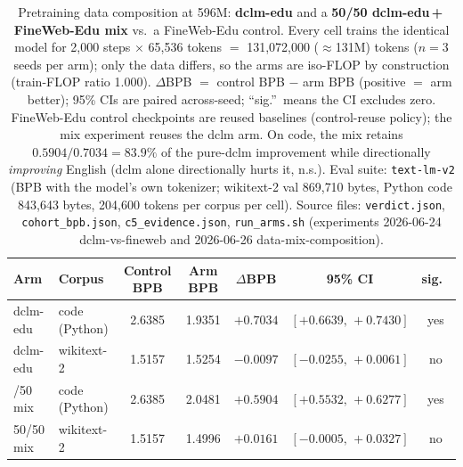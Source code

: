 \begin{table}[t]
\centering
\caption{Pretraining data composition at 596M: \textbf{dclm-edu} and a \textbf{50/50 dclm-edu\,+\,FineWeb-Edu mix} vs.\ a FineWeb-Edu control.
Every cell trains the identical model for 2{,}000 steps $\times$ 65{,}536 tokens $=$ 131{,}072{,}000 ($\approx$131M) tokens ($n{=}3$ seeds per arm); only the data differs, so the arms are iso-FLOP by construction (train-FLOP ratio 1.000).
$\Delta$BPB $=$ control BPB $-$ arm BPB (positive $=$ arm better); 95\% CIs are paired across-seed; ``sig.''\ means the CI excludes zero.
FineWeb-Edu control checkpoints are reused baselines (control-reuse policy); the mix experiment reuses the dclm arm.
On code, the mix retains $0.5904/0.7034 = 83.9\%$ of the pure-dclm improvement while directionally \emph{improving} English (dclm alone directionally hurts it, n.s.).
Eval suite: \texttt{text-lm-v2} (BPB with the model's own tokenizer; wikitext-2 val 869{,}710 bytes, Python code 843{,}643 bytes, 204{,}600 tokens per corpus per cell).
Source files: \texttt{verdict.json}, \texttt{cohort\_bpb.json}, \texttt{c5\_evidence.json}, \texttt{run\_arms.sh} (experiments 2026-06-24 dclm-vs-fineweb and 2026-06-26 data-mix-composition).}
\label{tab:data}
\footnotesize
\begin{tabular}{llccccc}
\toprule
Arm & Corpus & Control BPB & Arm BPB & $\Delta$BPB & 95\% CI & sig.\ \\
\midrule
dclm-edu      & code (Python)  & 2.6385 & 1.9351 & $+0.7034$ & $[+0.6639,\,+0.7430]$ & yes \\
dclm-edu      & wikitext-2     & 1.5157 & 1.5254 & $-0.0097$ & $[-0.0255,\,+0.0061]$ & no  \\
\addlinespace
50/50 mix     & code (Python)  & 2.6385 & 2.0481 & $+0.5904$ & $[+0.5532,\,+0.6277]$ & yes \\
50/50 mix     & wikitext-2     & 1.5157 & 1.4996 & $+0.0161$ & $[-0.0005,\,+0.0327]$ & no  \\
\bottomrule
\end{tabular}
\end{table}
